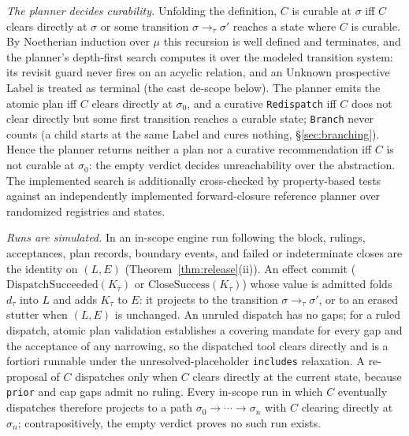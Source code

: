 \emph{The planner decides curability.} Unfolding the definition, $C$ is curable at $\sigma$ iff $C$ clears directly at $\sigma$ or some transition $\sigma\to_\tau\sigma'$ reaches a state where $C$ is curable. By Noetherian induction over $\mu$ this recursion is well defined and terminates, and the planner's depth-first search computes it over the modeled transition system: its revisit guard never fires on an acyclic relation, and an Unknown prospective Label is treated as terminal (the cast de-scope below). The planner emits the atomic plan iff $C$ clears directly at $\sigma_0$, and a curative \texttt{Redispatch} iff $C$ does not clear directly but some first transition reaches a curable state; \texttt{Branch} never counts (a child starts at the same Label and cures nothing, \S\ref{sec:branching}). Hence the planner returns neither a plan nor a curative recommendation iff $C$ is not curable at $\sigma_0$: the empty verdict decides unreachability over the abstraction. The implemented search is additionally cross-checked by property-based tests against an independently implemented forward-closure reference planner over randomized registries and states.

\emph{Runs are simulated.} In an in-scope engine run following the block, rulings, acceptances, plan records, boundary events, and failed or indeterminate closes are the identity on $(L,E)$ (Theorem~\ref{thm:release}(ii)). An effect commit ($\mathrm{DispatchSucceeded}(K_\tau)$ or $\mathrm{CloseSuccess}(K_\tau)$) whose value is admitted folds $d_\tau$ into $L$ and adds $K_\tau$ to $E$: it projects to the transition $\sigma\to_\tau\sigma'$, or to an erased stutter when $(L,E)$ is unchanged. An unruled dispatch has no gaps; for a ruled dispatch, atomic plan validation establishes a covering mandate for every gap and the acceptance of any narrowing, so the dispatched tool clears directly and is a fortiori runnable under the unresolved-placeholder \texttt{includes} relaxation. A re-proposal of $C$ dispatches only when $C$ clears directly at the current state, because \texttt{prior} and cap gaps admit no ruling. Every in-scope run in which $C$ eventually dispatches therefore projects to a path $\sigma_0\to\cdots\to\sigma_n$ with $C$ clearing directly at $\sigma_n$; contrapositively, the empty verdict proves no such run exists.

